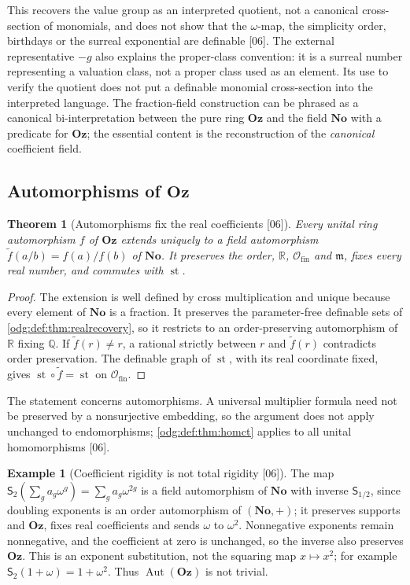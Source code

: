 \documentclass[11pt,oneside]{article}
\numberwithin{equation}{section}
\newtheorem{theorem}{Theorem}[section]
\theoremstyle{definition}
\newtheorem{example}[example]{Example}
\theoremstyle{remark}
\newcommand{\No}{\mathbf{No}}
\newcommand{\Oz}{\mathbf{Oz}}
\newcommand{\Q}{\mathbb Q}
\newcommand{\R}{\mathbb R}
\newcommand{\src}[1]{\textup{\textsf{\small[#1]}}}
\newcommand{\Aut}{\operatorname{Aut}}
\newcommand{\st}{\operatorname{st}}
\newcommand{\Ofin}{\mathcal O_{\mathrm{fin}}}
\begin{document}
This recovers the value group as an interpreted quotient, not a canonical
cross-section of monomials, and does not show that the $\omega$-map, the
simplicity order, birthdays or the surreal exponential are definable
\src{06}. The external representative $-g$ also explains the proper-class
convention: it is a surreal number representing a valuation class, not a
proper class used as an element. Its use to verify the quotient does not
put a definable monomial cross-section into the interpreted language.
The fraction-field construction can be phrased as a canonical
bi-interpretation between the pure ring $\Oz$ and the field $\No$ with a
predicate for $\Oz$; the essential content is the reconstruction of the
\emph{canonical} coefficient field.

\subsection{Automorphisms of \texorpdfstring{$\Oz$}{Oz}}

\begin{theorem}[Automorphisms fix the real coefficients \src{06}]\label{odg:def:thm:autreal}
Every unital ring automorphism $f$ of $\Oz$ extends uniquely to a field
automorphism $\tilde f(a/b)=f(a)/f(b)$ of $\No$. It preserves the order, $\R$,
$\Ofin$ and $\mathfrak m$, fixes every real number, and commutes with $\st$.
\end{theorem}
\begin{proof}
The extension is well defined by cross multiplication and unique because
every element of $\No$ is a fraction. It preserves the parameter-free
definable sets of \cref{odg:def:thm:realrecovery}, so it restricts to an
order-preserving automorphism of $\R$ fixing $\Q$. If $\tilde f(r)\ne r$, a
rational strictly between $r$ and $\tilde f(r)$ contradicts order
preservation. The definable graph of $\st$, with its real coordinate fixed,
gives $\st\circ\tilde f=\st$ on $\Ofin$.
\end{proof}

The statement concerns automorphisms. A universal multiplier formula need not
be preserved by a nonsurjective embedding, so the argument does not apply
unchanged to endomorphisms; \cref{odg:def:thm:homct} applies to all unital
homomorphisms \src{06}.

\begin{example}[Coefficient rigidity is not total rigidity \src{06}]\label{odg:def:ex:dilation}
The map $\mathsf S_2(\sum_ga_g\omega^g)=\sum_ga_g\omega^{2g}$ is a field
automorphism of $\No$ with inverse $\mathsf S_{1/2}$, since doubling exponents
is an order automorphism of $(\No,+)$; it preserves supports and $\Oz$, fixes
real coefficients and sends $\omega$ to $\omega^2$. Nonnegative exponents
remain nonnegative,
and the coefficient at zero is unchanged, so the inverse also preserves
$\Oz$. This is an exponent substitution, not the squaring map $x\mapsto x^2$;
for example $\mathsf S_2(1+\omega)=1+\omega^2$. Thus $\Aut(\Oz)$ is not
trivial.
\end{example}
\end{document}
